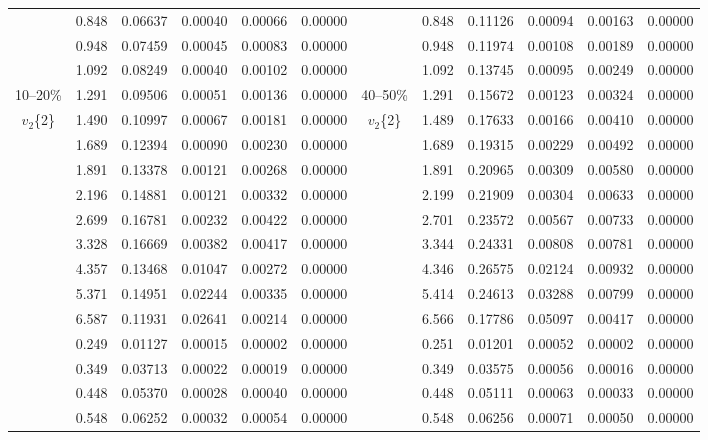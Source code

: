 \documentclass[aps,prc,superscriptaddress,showpacs,floatfix,twocolumn]{revtex4}
\begin{document}
\begin{table}[htbp]
\begin{ruledtabular}
\begin{tabular}{c|ccccc||c|ccccc}
 & 0.848 &  0.06637   & 0.00040  & 0.00066  & 0.00000 &  & 0.848 & 0.11126   &  0.00094 & 0.00163  & 0.00000 \\
 & 0.948 &  0.07459   & 0.00045  & 0.00083  & 0.00000 &  & 0.948 & 0.11974   &  0.00108 & 0.00189  & 0.00000 \\
 & 1.092 &  0.08249   & 0.00040  & 0.00102  & 0.00000 &  & 1.092 & 0.13745   &  0.00095 & 0.00249  & 0.00000 \\
10--20\% 
 & 1.291 & 0.09506   & 0.00051 &  0.00136  & 0.00000 &  40--50\% & 1.291 & 0.15672   &  0.00123 & 0.00324  & 0.00000 \\
$v_2$\{2\} 
 & 1.490 & 0.10997   & 0.00067   & 0.00181  & 0.00000 &  $v_2$\{2\} & 1.489 & 0.17633	&  0.00166 & 0.00410  & 0.00000 \\
 & 1.689 & 0.12394   & 0.00090   & 0.00230  & 0.00000 &             & 1.689 & 0.19315	&  0.00229 & 0.00492  & 0.00000 \\
 & 1.891 & 0.13378   & 0.00121   & 0.00268  & 0.00000 &             & 1.891 & 0.20965	&  0.00309 & 0.00580  & 0.00000 \\
 & 2.196 & 0.14881   & 0.00121   & 0.00332  & 0.00000 &             & 2.199 & 0.21909	&  0.00304 & 0.00633  & 0.00000 \\
 & 2.699 & 0.16781   & 0.00232   & 0.00422  & 0.00000 &             & 2.701 & 0.23572	&  0.00567 & 0.00733  & 0.00000 \\
 & 3.328 & 0.16669   & 0.00382   & 0.00417  & 0.00000 &             & 3.344 & 0.24331	&  0.00808 & 0.00781  & 0.00000 \\
 & 4.357 & 0.13468   & 0.01047   & 0.00272  & 0.00000 &             & 4.346 & 0.26575	&  0.02124 & 0.00932  & 0.00000 \\
 & 5.371 & 0.14951   & 0.02244   & 0.00335  & 0.00000 &             & 5.414 & 0.24613	&  0.03288 & 0.00799  & 0.00000 \\
 & 6.587 & 0.11931   & 0.02641   & 0.00214  & 0.00000 &             & 6.566 & 0.17786	&  0.05097 & 0.00417  & 0.00000 \\
\hline 
 & 0.249 & 0.01127   &  0.00015  &  0.00002 & 0.00000 &  & 0.251 & 0.01201   & 0.00052 & 0.00002  & 0.00000 \\
 & 0.349 & 0.03713   &  0.00022  &  0.00019 & 0.00000 &  & 0.349 & 0.03575   & 0.00056 & 0.00016  & 0.00000 \\
 & 0.448 & 0.05370   &  0.00028  &  0.00040 & 0.00000 &  & 0.448 & 0.05111   & 0.00063 & 0.00033  & 0.00000 \\
 & 0.548 & 0.06252   &  0.00032  &  0.00054 & 0.00000 &  & 0.548 & 0.06256   & 0.00071 & 0.00050  & 0.00000 \\

\end{tabular}
\end{ruledtabular}
\end{table}
\end{document}
